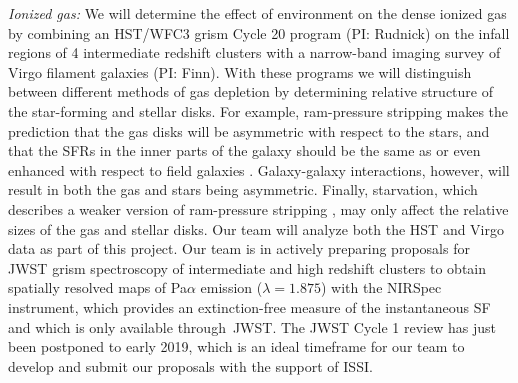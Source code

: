 \documentclass[11pt]{article}
\begin{document}
\textit{Ionized gas:} We will determine the effect of environment on the dense ionized
gas by combining an HST/WFC3 grism Cycle 20 program
(PI: Rudnick) on the infall regions of 4 intermediate redshift
clusters with a narrow-band imaging survey of Virgo filament galaxies (PI: Finn).  With these programs
we will distinguish between different methods of gas depletion by
determining relative structure of the star-forming and stellar disks.
For example, ram-pressure stripping makes the prediction that the gas
disks will be asymmetric \citep[e.g.][]{Quilis00,Crowl05} with respect
to the stars, and that the SFRs in the inner parts of the galaxy should
be the same as or even enhanced with respect to field galaxies
\citep{Koopmann04,Weinmann10,Poggianti17a}.  Galaxy-galaxy interactions, however,
will result in both the gas and stars being asymmetric.  Finally,
starvation, which describes a weaker version of ram-pressure stripping
\citep[e.g.][]{Larson80}, may only affect the relative sizes of the
gas and stellar disks. Our team will analyze both the HST and Virgo data as part of this project.   Our team is in actively preparing proposals for JWST grism spectroscopy of intermediate and high redshift clusters to obtain spatially resolved maps of Pa$\alpha$ emission ($\lambda=1.875$\micron) with the  NIRSpec instrument, which provides an extinction-free measure of the instantaneous SF and which is only available through~JWST.  The JWST Cycle 1 review has just been postponed to early 2019, which is an ideal timeframe for our team to develop and submit our proposals with the support of ISSI.

\end{document}
